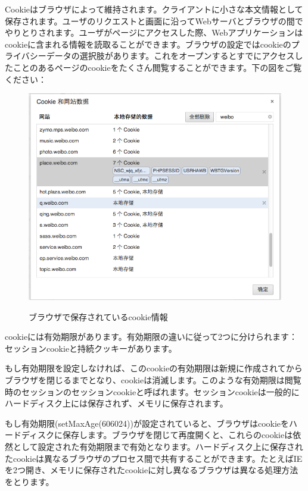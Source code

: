 Cookieはブラウザによって維持されます。クライアントに小さな本文情報として保存されます。ユーザのリクエストと画面に沿ってWebサーバとブラウザの間でやりとりされます。ユーザがページにアクセスした際、Webアプリケーションはcookieに含まれる情報を読取ることができます。ブラウザの設定ではcookieのプライバシーデータの選択肢があります。これをオープンするとすでにアクセスしたことのあるページのcookieをたくさん閲覧することができます。下の図をご覧ください：

\begin{figure}[H]
  \includegraphics[width=14cm]{6.1.cookie.png}
   \label{図6.3}
   \caption{ブラウザで保存されているcookie情報}
\end{figure}

cookieには有効期限があります。有効期限の違いに従って2つに分けられます：セッションcookieと持続クッキーがあります。

もし有効期限を設定しなければ、このcookieの有効期限は新規に作成されてからブラウザを閉じるまでとなり、cookieは消滅します。このような有効期限は閲覧時のセッションのセッションcookieと呼ばれます。セッションcookieは一般的にハードディスク上には保存されず、メモリに保存されます。

もし有効期限(setMaxAge(606024))が設定されていると、ブラウザはcookieをハードディスクに保存します。ブラウザを閉じて再度開くと、これらのcookieは依然として設定された有効期限まで有効となります。ハードディスク上に保存されたcookieは異なるブラウザのプロセス間で共有することができます。たとえばIEを2つ開き、メモリに保存されたcookieに対し異なるブラウザは異なる処理方法をとります。 　　


